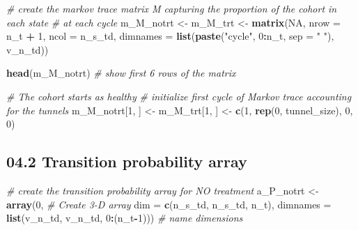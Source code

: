 \documentclass[]{article}
\newenvironment{Shaded}{\begin{snugshade}}{\end{snugshade}}
\newcommand{\KeywordTok}[1]{\textcolor[rgb]{0.13,0.29,0.53}{\textbf{#1}}}
\newcommand{\DataTypeTok}[1]{\textcolor[rgb]{0.13,0.29,0.53}{#1}}
\newcommand{\DecValTok}[1]{\textcolor[rgb]{0.00,0.00,0.81}{#1}}
\newcommand{\StringTok}[1]{\textcolor[rgb]{0.31,0.60,0.02}{#1}}
\newcommand{\CommentTok}[1]{\textcolor[rgb]{0.56,0.35,0.01}{\textit{#1}}}
\newcommand{\OtherTok}[1]{\textcolor[rgb]{0.56,0.35,0.01}{#1}}
\newcommand{\OperatorTok}[1]{\textcolor[rgb]{0.81,0.36,0.00}{\textbf{#1}}}
\newcommand{\NormalTok}[1]{#1}
\begin{document}
\begin{Shaded}
\begin{Highlighting}[]
\CommentTok{# create the markov trace matrix M capturing the proportion of the cohort in each state }
\CommentTok{# at each cycle}
\NormalTok{m_M_notrt <-}\StringTok{ }\NormalTok{m_M_trt <-}\StringTok{ }\KeywordTok{matrix}\NormalTok{(}\OtherTok{NA}\NormalTok{, }
                                \DataTypeTok{nrow =}\NormalTok{ n_t }\OperatorTok{+}\StringTok{ }\DecValTok{1}\NormalTok{, }\DataTypeTok{ncol =}\NormalTok{ n_s_td,}
                                \DataTypeTok{dimnames =} \KeywordTok{list}\NormalTok{(}\KeywordTok{paste}\NormalTok{(}\StringTok{"cycle"}\NormalTok{, }\DecValTok{0}\OperatorTok{:}\NormalTok{n_t, }\DataTypeTok{sep =} \StringTok{" "}\NormalTok{), v_n_td)) }

\KeywordTok{head}\NormalTok{(m_M_notrt) }\CommentTok{# show first 6 rows of the matrix }

\CommentTok{# The cohort starts as healthy}
\CommentTok{# initialize first cycle of Markov trace accounting for the tunnels}
\NormalTok{m_M_notrt[}\DecValTok{1}\NormalTok{, ] <-}\StringTok{ }\NormalTok{m_M_trt[}\DecValTok{1}\NormalTok{, ] <-}\StringTok{ }\KeywordTok{c}\NormalTok{(}\DecValTok{1}\NormalTok{, }\KeywordTok{rep}\NormalTok{(}\DecValTok{0}\NormalTok{, tunnel_size), }\DecValTok{0}\NormalTok{, }\DecValTok{0}\NormalTok{) }
\end{Highlighting}
\end{Shaded}

\subsection{04.2 Transition probability
array}\label{transition-probability-array}

\begin{Shaded}
\begin{Highlighting}[]
\CommentTok{# create the transition probability array for NO treatment}
\NormalTok{a_P_notrt <-}\StringTok{ }\KeywordTok{array}\NormalTok{(}\DecValTok{0}\NormalTok{,                                          }\CommentTok{# Create 3-D array}
                   \DataTypeTok{dim =} \KeywordTok{c}\NormalTok{(n_s_td, n_s_td, n_t),}
                   \DataTypeTok{dimnames =} \KeywordTok{list}\NormalTok{(v_n_td, v_n_td, }\DecValTok{0}\OperatorTok{:}\NormalTok{(n_t}\OperatorTok{-}\DecValTok{1}\NormalTok{))) }\CommentTok{# name dimensions}
\end{Highlighting}
\end{Shaded}
\end{document}
